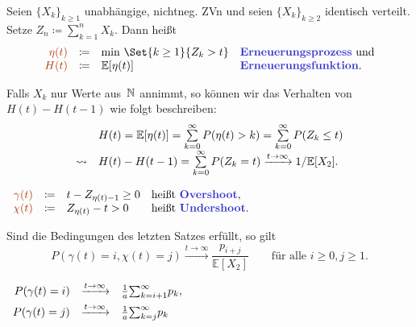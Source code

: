 \documentclass{cheat-sheet}
\newcommand{\E}{\mathbb{E}} %
\newcommand{\Defn}[1]{\textcolor{DefinitionColor}{#1}}
\begin{document}
\begin{defn}
  Seien $\{ X_k \}_{k \geq 1}$ unabhängige, nichtneg. ZVn und seien $\{ X_k \}_{k \geq 2}$ identisch verteilt.
  Setze $Z_n \coloneqq {\sum}_{k=1}^n X_k$.
  Dann heißt
  \[
    \begin{array}{r c l l}
      \Defn{\eta(t)} &\coloneqq& \min\,\Set{k \geq 1}{Z_k > t} &
      \text{\emph{Erneuerungsprozess} und} \\
      \Defn{H(t)} &\coloneqq& \E[\eta(t)]
      & \text{\emph{Erneuerungsfunktion}.}
    \end{array}
  \]
\end{defn}

Falls $X_k$ nur Werte aus~$\mathbb{N}$ annimmt, so können wir das Verhalten von $H(t) - H(t-1)$ wie folgt beschreiben:
\[\begin{array}{r l}
  & H(t) = \E[\eta(t)] = \sum_{k=0}^\infty P(\eta(t) > k) = \sum_{k=0}^\infty P(Z_k \leq t) \\
  \rightsquigarrow & H(t) - H(t-1) = \sum_{k=0}^\infty P(Z_k = t) \xrightarrow{t \to \infty} 1/\E[X_2].
\end{array}\]

\begin{defn}
  $
    \begin{array}[t]{r c l l}
    \Defn{\gamma(t)} &\coloneqq& t - Z_{\eta(t)-1} \geq 0 & \text{heißt \emph{Overshoot},} \\
    \Defn{\chi(t)} &\coloneqq& Z_{\eta(t)} - t > 0 & \text{heißt \emph{Undershoot}.}
    \end{array}
  $
\end{defn}

\begin{satz}
  Sind die Bedingungen des letzten Satzes erfüllt, so gilt
  \[
    P(\gamma(t)=i, \chi(t)=j) \xrightarrow{t \to \infty} \frac{p_{i+j}}{\E[X_2]}
    \qquad \text{für alle } i \geq 0, j \geq 1.
  \]
\end{satz}

\begin{kor}
  $
    \begin{array}[t]{r c l}
      P(\gamma(t) = i) &\xrightarrow{t \to \infty}& \tfrac{1}{a} {\sum}_{k=i+1}^\infty p_k, \\[0.15cm]
      P(\gamma(t) = j) &\xrightarrow{t \to \infty}& \tfrac{1}{a} {\sum}_{k=j}^\infty p_k
    \end{array}
  $
\end{kor}

\end{document}
